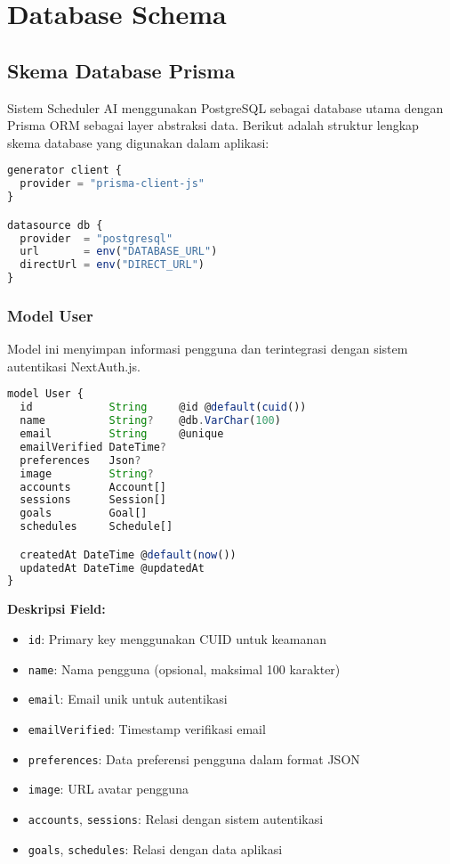 \section{Database Schema}

\subsection{Skema Database Prisma}

Sistem Scheduler AI menggunakan PostgreSQL sebagai database utama dengan Prisma ORM sebagai layer abstraksi data. Berikut adalah struktur lengkap skema database yang digunakan dalam aplikasi:

\begin{lstlisting}[language=JavaScript, caption=Konfigurasi Skema Prisma]
generator client {
  provider = "prisma-client-js"
}

datasource db {
  provider  = "postgresql"
  url       = env("DATABASE_URL")
  directUrl = env("DIRECT_URL")
}
\end{lstlisting}

\subsubsection{Model User}
Model ini menyimpan informasi pengguna dan terintegrasi dengan sistem autentikasi NextAuth.js.

\begin{lstlisting}[language=JavaScript, caption=Skema Model User]
model User {
  id            String     @id @default(cuid())
  name          String?    @db.VarChar(100)
  email         String     @unique
  emailVerified DateTime?
  preferences   Json?
  image         String?
  accounts      Account[]
  sessions      Session[]
  goals         Goal[]
  schedules     Schedule[]

  createdAt DateTime @default(now())
  updatedAt DateTime @updatedAt
}
\end{lstlisting}

\textbf{Deskripsi Field:}
\begin{itemize}
\item \texttt{id}: Primary key menggunakan CUID untuk keamanan
\item \texttt{name}: Nama pengguna (opsional, maksimal 100 karakter)
\item \texttt{email}: Email unik untuk autentikasi
\item \texttt{emailVerified}: Timestamp verifikasi email
\item \texttt{preferences}: Data preferensi pengguna dalam format JSON
\item \texttt{image}: URL avatar pengguna
\item \texttt{accounts}, \texttt{sessions}: Relasi dengan sistem autentikasi
\item \texttt{goals}, \texttt{schedules}: Relasi dengan data aplikasi
\end{itemize}

